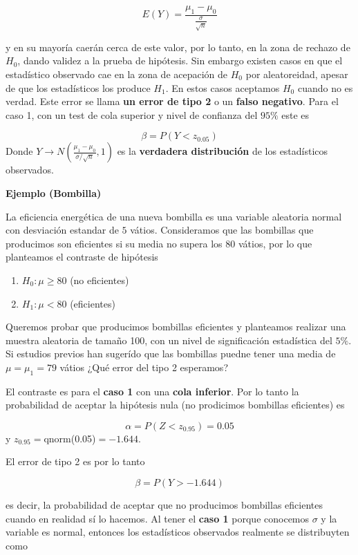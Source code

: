 \documentclass[
]{book}
\providecommand{\tightlist}{%
  \setlength{\itemsep}{0pt}\setlength{\parskip}{0pt}}
\begin{document}
\[E(Y)=\frac{\mu_1-\mu_0}{\frac{\sigma}{\sqrt{n}}}\]

y en su mayoría caerán cerca de este valor, por lo tanto, en la zona de rechazo de \(H_0\), dando validez a la prueba de hipótesis. Sin embargo existen casos en que el estadístico observado cae en la zona de acepación de \(H_0\) por aleatoreidad, apesar de que los estadísticos los produce \(H_1\). En estos casos aceptamos \(H_0\) cuando no es verdad. Este error se llama \textbf{un error de tipo 2} o un \textbf{falso negativo}. Para el caso 1, con un test de cola superior y nivel de confianza del \(95\%\) este es

\[\beta= P(Y < z_{0.05})\]
Donde \(Y \rightarrow N(\frac{\mu_1-\mu_0}{\sigma/\sqrt{n}},1)\) es la \textbf{verdadera distribución} de los estadísticos observados.

\textbf{Ejemplo (Bombilla)}

La eficiencia energética de una nueva bombilla es una variable aleatoria normal con desviación estandar de \(5\) vátios. Consideramos que las bombillas que producimos son eficientes si su media no supera los \(80\) vátios, por lo que planteamos el contraste de hipótesis

\begin{enumerate}
\def\labelenumi{\alph{enumi}.}
\tightlist
\item
  \(H_0 : \mu \geq 80\) (no eficientes)
\item
  \(H_1 : \mu < 80\) (eficientes)
\end{enumerate}

Queremos probar que producimos bombillas eficientes y planteamos realizar una muestra aleatoria de tamaño 100, con un nivel de significación estadística del \(5\%\). Si estudios previos han sugerído que las bombillas puedne tener una media de \(\mu=\mu_1=79\) vátios ¿Qué error del tipo 2 esperamos?

El contraste es para el \textbf{caso 1} con una \textbf{cola inferior}. Por lo tanto la probabilidad de aceptar la hipótesis nula (no prodicimos bombillas eficientes) es

\[\alpha = P(Z< z_{0.95})=0.05\]
y \(z_{0.95}=\)qnorm(0.05)\(=-1.644\).

El error de tipo 2 es por lo tanto

\[\beta= P(Y > -1.644)\]

es decir, la probabilidad de aceptar que no producimos bombillas eficientes cuando en realidad sí lo hacemos. Al tener el \textbf{caso 1} porque conocemos \(\sigma\) y la variable es normal, entonces los estadísticos observados realmente se distribuyten como
\end{document}

